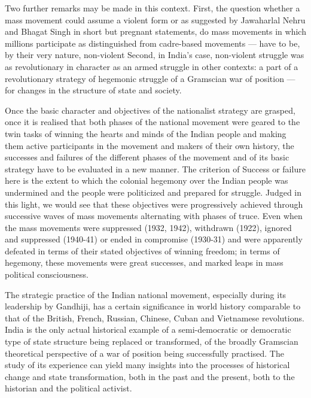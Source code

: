 Two further remarks may be made in this context. First, the question whether a mass movement could assume a violent form or as suggested by Jawaharlal Nehru and Bhagat Singh in short but pregnant statements, do mass movements in which millions participate as distinguished from cadre-based movements — have to be, by their very nature, non-violent Second, in India's case, non-violent struggle was as revolutionary in character as an armed struggle in other contexts: a part of a revolutionary strategy of hegemonic struggle of a Gramscian war of position — for changes in the structure of state and society. 

Once the basic character and objectives of the nationalist strategy are grasped, once it is realised that both phases of the national movement were geared to the twin tasks of winning the hearts and minds of the Indian people and making them active participants in the movement and makers of their own history, the successes and failures of the different phases of the movement and of its basic strategy have to be evaluated in a new manner. The criterion of Success or failure here is the extent to which the colonial hegemony over the Indian people was undermined and the people were politicized and prepared for struggle. Judged in this light, we would see that these objectives were progressively achieved through successive waves of mass movements alternating with phases of truce. Even when the mass movements were suppressed (1932, 1942), withdrawn (1922), ignored and suppressed (1940-41) or ended in compromise (1930-31) and were apparently defeated in terms of their stated objectives of winning freedom; in terms of hegemony, these movements were great successes, and marked leaps in mass political consciousness. 

The strategic practice of the Indian national movement, especially during its leadership by Gandhiji, has a certain significance in world history comparable to that of the British, French, Russian, Chinese, Cuban and Vietnamese revolutions. India is the only actual historical example of a semi-democratic or democratic type of state structure being replaced or transformed, of the broadly Gramscian theoretical perspective of a war of position being successfully practised. The study of its experience can yield many insights into the processes of historical change and state transformation, both in the past and the present, both to the historian and the political activist. 

